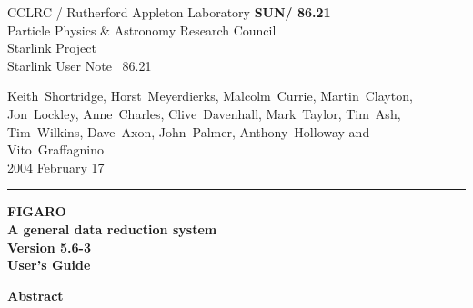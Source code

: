 \documentclass[11pt,twoside]{article}
\newcommand{\Figaroversion}{5.6-3~}
\newcommand{\stardoccategory}  {Starlink User Note}
\newcommand{\stardocinitials}  {SUN}
\newcommand{\stardocnumber}    { 86.21}
\newcommand{\stardocauthors}   {Keith~Shortridge, Horst~Meyerdierks,
                                Malcolm~Currie, Martin~Clayton, Jon~Lockley,
                                Anne~Charles, Clive~Davenhall,
                                Mark~Taylor, Tim~Ash, Tim~Wilkins, Dave~Axon,
                                John~Palmer, Anthony~Holloway and
                                Vito~Graffagnino}
\newcommand{\stardocdate}      {2004 February 17}
\newcommand{\stardoctitle}     {FIGARO \\ [1ex] A general data reduction system}
\newcommand{\stardocversion}   {Version \Figaroversion}
\newcommand{\stardocmanual}    {User's Guide}
\newcommand{\stardocname}{\stardocinitials /\stardocnumber}
\newenvironment{latexonly}{}{}
\begin{document}
\thispagestyle{empty}

\begin{latexonly}
   CCLRC / {\sc Rutherford Appleton Laboratory} \hfill {\bf \stardocname}\\
   {\large Particle Physics \& Astronomy Research Council}\\
   {\large Starlink Project\\}
   {\large \stardoccategory\ \stardocnumber}
   \begin{flushright}
   \stardocauthors\\
   \stardocdate
   \end{flushright}
   \vspace{-4mm}
   \rule{\textwidth}{0.5mm}
   \vspace{5mm}
   \begin{center}
   {\Huge\bf  \stardoctitle \\ [2.5ex]}
   {\LARGE\bf \stardocversion \\ [4ex]}
   {\Huge\bf  \stardocmanual}
   \end{center}
   \vspace{5mm}

   \vspace{10mm}
   \begin{center}
      {\Large\bf Abstract}
   \end{center}
\end{latexonly}
\end{document}
